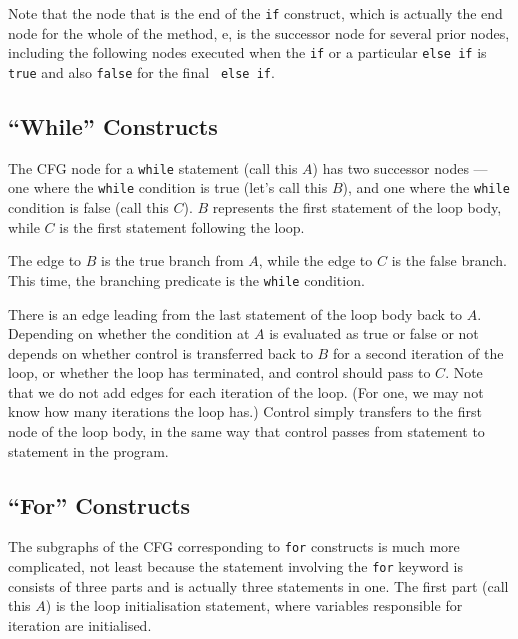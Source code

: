 Note that the node that is the end of the {\tt if} construct, which is actually
the end node for the whole of the method, e, is the successor node for several
prior nodes, including the following nodes executed when the {\tt if} or a
particular {\tt else if} is {\tt true} and also {\tt false} for the final {\tt
else if}.


\subsection{``While'' Constructs}

The CFG node for a {\tt while} statement (call this $A$) has two successor nodes
--- one where the {\tt while} condition is true (let's call this $B$), and one
where the {\tt while} condition is false (call this $C$). $B$ represents the
first statement of the loop body, while $C$ is the first statement following the
loop. 

The edge to $B$ is the true branch from $A$, while the edge to $C$ is the false
branch. This time, the branching predicate is the {\tt while} condition.


There is an edge leading from the last statement of the loop body back to $A$.
Depending on whether the condition at $A$ is evaluated as true or false or not
depends on whether control is transferred back to $B$ for a second iteration of
the loop, or whether the loop has terminated, and control should pass to $C$.
Note that we do not add edges for each iteration of the loop. (For one, we may
not know how many iterations the loop has.) Control simply transfers to the
first node of the loop body, in the same way that control passes from statement
to statement in the program.


\subsection{``For'' Constructs}

The subgraphs of the CFG corresponding to {\tt for} constructs is much more
complicated, not least because the statement involving the {\tt for} keyword is
consists of three parts and is actually three statements in one. The first part
(call this $A$) is the loop initialisation statement, where variables
responsible for iteration are initialised. 

